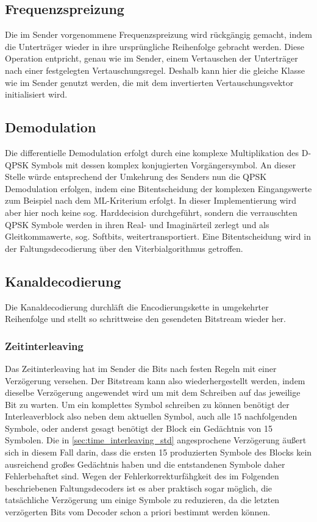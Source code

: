 
\subsection{Frequenzspreizung}
Die im Sender vorgenommene Frequenzspreizung wird rückgängig gemacht, indem die Unterträger wieder in ihre ursprüngliche Reihenfolge gebracht werden. Diese Operation entpricht, genau wie im Sender, einem Vertauschen der Unterträger nach einer festgelegten Vertauschungsregel. Deshalb kann hier die gleiche Klasse wie im Sender genutzt werden, die mit dem invertierten Vertauschungsvektor initialisiert wird.

\subsection{Demodulation}
Die differentielle Demodulation erfolgt durch eine komplexe Multiplikation des D-QPSK Symbols mit dessen komplex konjugierten Vorgängersymbol.
An dieser Stelle würde entsprechend der Umkehrung des Senders nun die QPSK Demodulation erfolgen, indem eine Bitentscheidung der komplexen Eingangswerte zum Beispiel nach dem \ac{ML}-Kriterium erfolgt. In dieser Implementierung wird aber hier noch keine sog. Harddecision durchgeführt, sondern die verrauschten QPSK Symbole werden in ihren Real- und Imaginärteil zerlegt und als Gleitkommawerte, sog. Softbits, weitertransportiert. Eine Bitentscheidung wird in der Faltungsdecodierung über den Viterbialgorithmus getroffen.

\subsection{Kanaldecodierung}
Die Kanaldecodierung durchläft die Encodierungskette in umgekehrter Reihenfolge und stellt so schrittweise den gesendeten Bitstream wieder her.

\subsubsection{Zeitinterleaving}
Das Zeitinterleaving hat im Sender die Bits nach festen Regeln mit einer Verzögerung versehen. Der Bitstream kann also wiederhergestellt werden, indem dieselbe Verzögerung angewendet wird um mit dem Schreiben auf das jeweilige Bit zu warten. Um ein komplettes Symbol schreiben zu können benötigt der Interleaverblock also neben dem aktuellen Symbol, auch alle 15 nachfolgenden Symbole, oder anderst gesagt benötigt der Block ein Gedächtnis von 15 Symbolen. Die in \ref{sec:time_interleaving_std} angesprochene Verzögerung äußert sich in diesem Fall darin, dass die ersten 15 produzierten Symbole des Blocks kein ausreichend großes Gedächtnis haben und die entstandenen Symbole daher Fehlerbehaftet sind. Wegen der Fehlerkorrekturfähgkeit des im Folgenden beschriebenen Faltungsdecoders ist es aber praktisch sogar möglich, die tatsächliche Verzögerung um einige Symbole zu reduzieren, da die letzten verzögerten Bits vom Decoder schon a priori bestimmt werden können.

